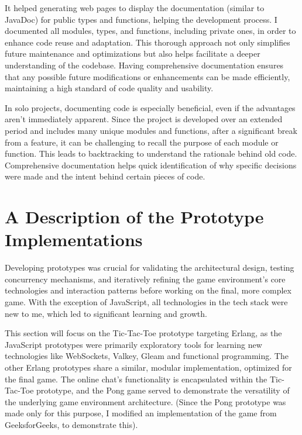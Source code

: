 \documentclass[]{final}
\begin{document}
It helped generating web pages to display the documentation (similar to JavaDoc)
for public types and functions, helping the development process.
I documented all modules, types, and functions, including private ones,
in order to enhance code reuse and adaptation. This thorough approach not
only simplifies future maintenance and optimizations but also helps facilitate a
deeper understanding of the codebase.
Having comprehensive documentation
ensures that any possible future modifications or enhancements can be made
efficiently, maintaining a high standard of code quality and usability.

In solo projects, documenting code is especially beneficial, even if the advantages
aren't immediately apparent. Since the project is developed over an extended period
and includes many unique modules and functions, after a significant break from a
feature, it can be challenging to recall the purpose of each module or function.
This leads to backtracking to understand the rationale behind old code.
Comprehensive documentation helps quick identification of why specific decisions
were made and the intent behind certain pieces of code.

\chapter{A Description of the Prototype Implementations}

Developing prototypes was crucial for validating the architectural design,
testing concurrency mechanisms, and iteratively refining the game environment's
core technologies and interaction patterns before working on the final,
more complex game. With the exception of JavaScript,
all technologies in the tech stack were new to me, which led to
significant learning and growth.

This section will focus on the Tic-Tac-Toe prototype targeting Erlang,
as the JavaScript prototypes were primarily exploratory tools for learning
new technologies like WebSockets, Valkey, Gleam and functional programming.
The other Erlang prototypes share a similar, modular implementation,
optimized for the final game. The online chat's functionality is
encapsulated within the Tic-Tac-Toe prototype, and the Pong game
served to demonstrate the versatility of the underlying game
environment architecture. (Since the Pong prototype was made only for this purpose,
I modified an implementation of the game from GeeksforGeeks, to demonstrate this).\cite{GeeksforGeeks_pong_2021}
\end{document}
